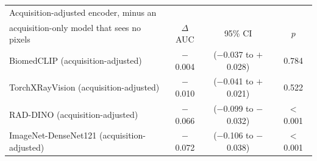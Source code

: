 \begin{tabular}{lccc}
\toprule
Acquisition-adjusted encoder, minus an & & & \\
acquisition-only model that sees no pixels & $\Delta$AUC & 95\% CI & $p$ \\
\midrule
BiomedCLIP (acquisition-adjusted) & $-$0.004 & ($-$0.037 to $+$0.028) & 0.784 \\
TorchXRayVision (acquisition-adjusted) & $-$0.010 & ($-$0.041 to $+$0.021) & 0.522 \\
RAD-DINO (acquisition-adjusted) & $-$0.066 & ($-$0.099 to $-$0.032) & $<$0.001 \\
ImageNet-DenseNet121 (acquisition-adjusted) & $-$0.072 & ($-$0.106 to $-$0.038) & $<$0.001 \\
\bottomrule
\end{tabular}
